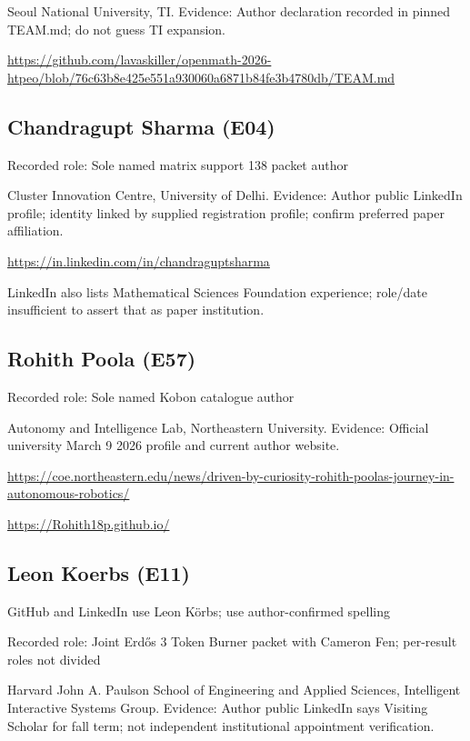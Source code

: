 \documentclass[11pt,a4paper]{article}
\begin{document}
Seoul National University, TI. Evidence: Author declaration recorded in pinned TEAM.md; do not guess TI expansion.

{\small \url{https://github.com/lavaskiller/openmath-2026-htpeo/blob/76c63b8e425e551a930060a6871b84fe3b4780db/TEAM.md}\par}

\subsection{Chandragupt Sharma (E04)}
Recorded role: Sole named matrix support 138 packet author

Cluster Innovation Centre, University of Delhi. Evidence: Author public LinkedIn profile; identity linked by supplied registration profile; confirm preferred paper affiliation.

{\small \url{https://in.linkedin.com/in/chandraguptsharma}\par}

LinkedIn also lists Mathematical Sciences Foundation experience; role/date insufficient to assert that as paper institution.

\subsection{Rohith Poola (E57)}
Recorded role: Sole named Kobon catalogue author

Autonomy and Intelligence Lab, Northeastern University. Evidence: Official university March 9 2026 profile and current author website.

{\small \url{https://coe.northeastern.edu/news/driven-by-curiosity-rohith-poolas-journey-in-autonomous-robotics/}\par}

{\small \url{https://Rohith18p.github.io/}\par}

\subsection{Leon Koerbs (E11)}
GitHub and LinkedIn use Leon Körbs; use author-confirmed spelling

Recorded role: Joint Erdős 3 Token Burner packet with Cameron Fen; per-result roles not divided

Harvard John A. Paulson School of Engineering and Applied Sciences, Intelligent Interactive Systems Group. Evidence: Author public LinkedIn says Visiting Scholar for fall term; not independent institutional appointment verification.
\end{document}
